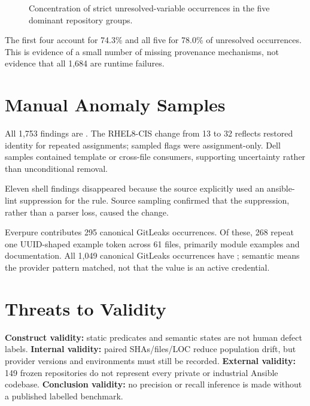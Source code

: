\begin{figure}[H]
\centering
{}
\caption{Concentration of strict unresolved-variable occurrences in the five
dominant repository groups.}
\label{fig:unresolved_concentration}
\end{figure}
The first four account for 74.3\% and all five for 78.0\% of unresolved
occurrences. This is evidence of a small number of missing provenance
mechanisms, not evidence that all 1,684 are runtime failures.

\section{Manual Anomaly Samples}
All 1,753  findings are . The RHEL8-CIS change
from 13 to 32 reflects restored identity for repeated assignments; sampled
flags were assignment-only. Dell samples contained template or cross-file
consumers, supporting uncertainty rather than unconditional removal.

Eleven shell findings disappeared because the source explicitly used an
ansible-lint  suppression for the
 rule. Source sampling confirmed that the
suppression, rather than a parser loss, caused the change.

Everpure contributes 295 canonical GitLeaks occurrences. Of these, 268 repeat
one UUID-shaped example token across 61 files, primarily module examples and
documentation. All 1,049 canonical GitLeaks occurrences have
; semantic  means the
provider pattern matched, not that the value is an active credential.

\section{Threats to Validity}
\textbf{Construct validity:} static predicates and semantic states are not
human defect labels. \textbf{Internal validity:} paired SHAs/files/LOC reduce
population drift, but provider versions and environments must still be recorded.
\textbf{External validity:} 149 frozen repositories do not represent every
private or industrial Ansible codebase. \textbf{Conclusion validity:} no
precision or recall inference is made without a published labelled benchmark.
